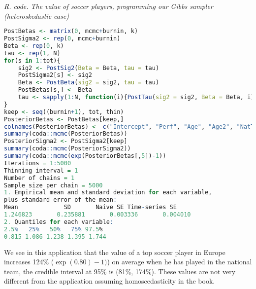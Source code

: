 \begin{enumerate}[leftmargin=*]
\begin{tcolorbox}[enhanced,width=4.67in,center upper,
	fontupper=\large\bfseries,drop shadow southwest,sharp corners]
	\textit{R. code. The value of soccer players, programming our Gibbs sampler (heteroskedastic case)}
	\begin{VF}
		\begin{lstlisting}[language=R]		
PostBetas <- matrix(0, mcmc+burnin, k)
PostSigma2 <- rep(0, mcmc+burnin)
Beta <- rep(0, k)
tau <- rep(1, N)
for(s in 1:tot){
	sig2 <- PostSig2(Beta = Beta, tau = tau)
	PostSigma2[s] <- sig2
	Beta <- PostBeta(sig2 = sig2, tau = tau)
	PostBetas[s,] <- Beta
	tau <- sapply(1:N, function(i){PostTau(sig2 = sig2, Beta = Beta, i)})
}
keep <- seq((burnin+1), tot, thin)
PosteriorBetas <- PostBetas[keep,]
colnames(PosteriorBetas) <- c("Intercept", "Perf", "Age", "Age2", "NatTeam", "Goals", "Exp", "Exp2")
summary(coda::mcmc(PosteriorBetas))
PosteriorSigma2 <- PostSigma2[keep]
summary(coda::mcmc(PosteriorSigma2))
summary(coda::mcmc(exp(PosteriorBetas[,5])-1))
Iterations = 1:5000
Thinning interval = 1 
Number of chains = 1 
Sample size per chain = 5000 
1. Empirical mean and standard deviation for each variable,
plus standard error of the mean:
Mean             SD       Naive SE Time-series SE 
1.246823       0.235881       0.003336       0.004010 
2. Quantiles for each variable:
2.5%   25%   50%   75% 97.5% 
0.815 1.086 1.238 1.395 1.744 					
\end{lstlisting}
	\end{VF}
\end{tcolorbox} 
We see in this application that the value of a top soccer player in Europe increases 124\% ($\exp(0.80)-1)$) on average when he has played in the national team, the credible interval at 95\% is (81\%, 174\%). These values are not very different from the application assuming homoscedasticity in the book.      
	
\end{enumerate}